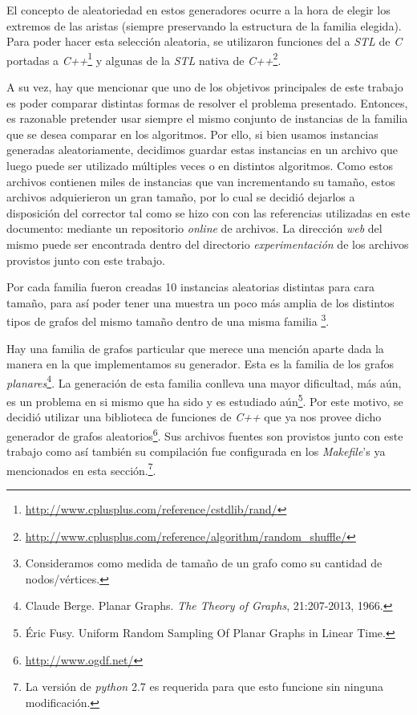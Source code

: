 \par El concepto de aleatoriedad en estos generadores ocurre a la hora de elegir
    los extremos de las aristas (siempre preservando la estructura de la familia
    elegida). Para poder hacer esta selecci\'on aleatoria, se utilizaron funciones
    del a \emph{STL} de \emph{C} portadas a \emph{C++}\footnote{%
    \url{http://www.cplusplus.com/reference/cstdlib/rand/}} y algunas de la
    \emph{STL} nativa de \emph{C++}\footnote{%
    \url{http://www.cplusplus.com/reference/algorithm/random_shuffle/}}.

\par A su vez, hay que mencionar que uno de los objetivos principales de este
    trabajo es poder comparar distintas formas de resolver el problema
    presentado. Entonces, es razonable pretender usar siempre el mismo conjunto
    de instancias de la familia que se desea comparar en los algoritmos. Por
    ello, si bien usamos instancias generadas aleatoriamente, decidimos guardar
    estas instancias en un archivo que luego puede ser utilizado m\'ultiples
    veces o en distintos algoritmos. Como estos archivos contienen miles de
    instancias que van incrementando su tama\~no, estos archivos adquierieron
    un gran tama\~no, por lo cual se decidi\'o dejarlos a disposici\'on del
    corrector tal como se hizo con con las referencias utilizadas en este
    documento: mediante un repositorio \emph{online} de archivos. La direcci\'on
    \emph{web} del mismo puede ser encontrada dentro del directorio \emph{%
    experimentaci\'on} de los archivos provistos junto con este trabajo.

\par Por cada familia fueron creadas 10 instancias aleatorias distintas para
    cara tama\~no, para as\'i poder tener una muestra un poco m\'as amplia 
    de los distintos tipos de grafos del mismo tama\~no dentro de una misma familia
    \footnote{Consideramos como medida de tama\~no de un grafo como su cantidad
    de nodos/v\'ertices.}.

\par Hay una familia de grafos particular que merece una menci\'on aparte dada
    la manera en la que implementamos su generador. Esta es la familia de los
    grafos \emph{planares}\footnote{Claude Berge. Planar Graphs. \emph{The Theory
    of Graphs}, 21:207-2013, 1966.}. La generaci\'on de esta familia conlleva
    una mayor dificultad, m\'as a\'un, es un problema en si mismo que ha sido
    y es estudiado a\'un\footnote{\'Eric Fusy. Uniform Random Sampling Of Planar
    Graphs in Linear Time.}. Por este motivo, se decidi\'o utilizar una
    biblioteca de funciones de \emph{C++} que ya nos provee dicho generador
    de grafos aleatorios\footnote{\url{http://www.ogdf.net/}}. Sus archivos
    fuentes son provistos junto con este trabajo como as\'i tambi\'en su
    compilaci\'on fue configurada en los \emph{Makefile}'s ya mencionados en
    esta secci\'on.\footnote{La versi\'on de \emph{python} 2.7 es requerida para
    que esto funcione sin ninguna modificaci\'on.}.

